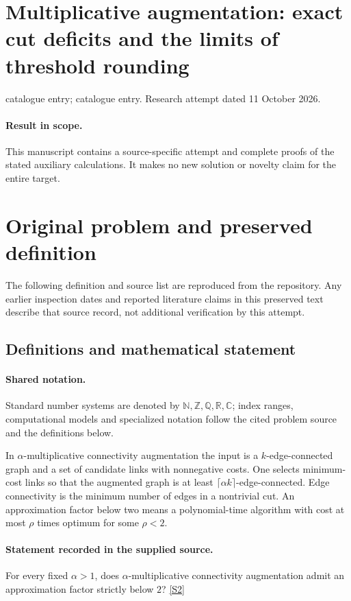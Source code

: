 \documentclass[11pt]{article}
\begin{document}
\section*{Multiplicative augmentation: exact cut deficits and the limits of threshold rounding}
\noindent catalogue entry; catalogue entry. Research attempt dated 11 October 2026.
\paragraph{Result in scope.}This manuscript contains a source-specific attempt and complete proofs of the stated auxiliary calculations. It makes no new solution or novelty claim for the entire target.
\section{Original problem and preserved definition}
The following definition and source list are reproduced from the repository. Any earlier inspection dates and reported literature claims in this preserved text describe that source record, not additional verification by this attempt.
\subsection{Definitions and mathematical statement}

\paragraph{Shared notation.}Standard number systems are denoted by $\mathbb N,\mathbb Z,\mathbb Q,\mathbb R,\mathbb C$; index ranges, computational models and specialized notation follow the cited problem source and the definitions below.


In $\alpha$-multiplicative connectivity augmentation the input is a $k$-edge-connected graph and a set of candidate links with nonnegative costs. One selects minimum-cost links so that the augmented graph is at least $\lceil\alpha k\rceil$-edge-connected. Edge connectivity is the minimum number of edges in a nontrivial cut. An approximation factor below two means a polynomial-time algorithm with cost at most $\rho$ times optimum for some $\rho<2$.
\paragraph{Statement recorded in the supplied source.}
For every fixed $\alpha>1$, does $\alpha$-multiplicative connectivity augmentation admit an approximation factor strictly below $2$? \href{https://doi.org/10.4171/owr/2021/53}{[S2]}
\end{document}
